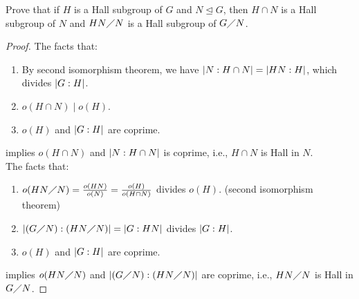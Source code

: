 \documentclass{report}
\begin{document}
\begin{question}{}{}
Prove that if $H$ is a Hall subgroup of  $G$ and  $N\trianglelefteq G$, then $H \cap N$ is a Hall subgroup of $N$ and  $HN\diagup N$ is a Hall subgroup of $G \diagup N$. 
\end{question}
\begin{proof}
The facts that: 
\begin{enumerate}[label=(\roman*)]
  \item By second isomorphism theorem, we have $\left|N:H\cap N\right|=\left|HN:H\right|$, which divides $\left|G:H\right|$.   
  \item $o(H\cap N)\mid  o(H)$. 
  \item $o(H)$ and $\left|G:H\right|$ are coprime. 
\end{enumerate}
implies $o(H\cap N)$ and $\left|N:H\cap N\right|$ is coprime, i.e., $H\cap N$ is Hall in $N$.  \\

The facts that: 
\begin{enumerate}[label=(\roman*)]
  \item $o(HN\diagup N)= \frac{o(HN)}{o(N)}= \frac{o(H)}{o(H\cap N)}$ divides $o(H)$. (second isomorphism theorem) 
  \item $ \left|(G\diagup N):(HN \diagup N)\right|= \left|G:HN\right|$ divides $\left|G:H\right|$. 
  \item  $o(H)$ and $\left|G:H\right|$ are coprime.  
\end{enumerate}
implies $o(HN\diagup N)$  and $\left|(G\diagup N): (HN\diagup N)\right|$ are coprime, i.e., $HN\diagup N$ is Hall in $G \diagup N$.



\end{proof}
\end{document}
